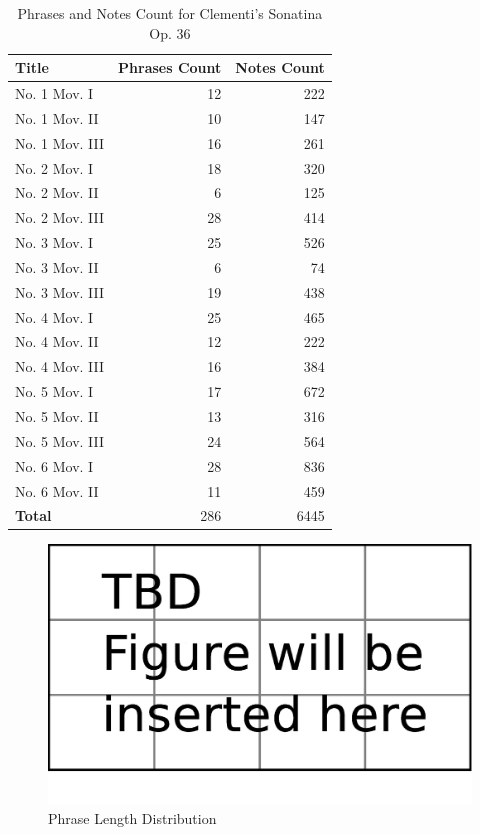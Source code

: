 \begin{table}[bp]
   \centering
   \caption{Phrases and Notes Count for Clementi's Sonatina Op. 36}
   \label{tab:clemcount}
   \begin{tabular}{lrr}
      \hline
      \textbf{Title}&\textbf{Phrases Count}&\textbf{Notes Count}\\
      \hline
      No. 1 Mov. I&12&222\\
      No. 1 Mov. II&10&147\\
      No. 1 Mov. III&16&261\\
      No. 2 Mov. I&18&320\\
      No. 2 Mov. II&6&125\\
      No. 2 Mov. III&28&414\\
      No. 3 Mov. I&25&526\\
      No. 3 Mov. II&6&74\\
      No. 3 Mov. III&19&438\\
      No. 4 Mov. I&25&465\\
      No. 4 Mov. II&12&222\\
      No. 4 Mov. III&16&384\\
      No. 5 Mov. I&17&672\\
      No. 5 Mov. II&13&316\\
      No. 5 Mov. III&24&564\\
      No. 6 Mov. I&28&836\\
      No. 6 Mov. II&11&459\\
      \hline
      \textbf{Total} &286&6445\\
      \hline
   \end{tabular}
\end{table}
\begin{figure}[tp]
   \begin{center}
      \includegraphics[width=\textwidth]{fig/TBDFigure}

   \end{center}
   \caption{Phrase Length Distribution}
   \label{fig:phrlength}
\end{figure}


